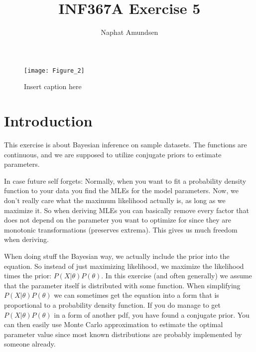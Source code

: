 \documentclass[12pt]{article}
\begin{document}
\title{\textbf{INF367A Exercise 5}}
\author{Naphat Amundsen}
\maketitle
\sectionfont{\fontsize{14}{15}\selectfont}
\subsectionfont{\fontsize{12}{15}\selectfont}
\subsubsectionfont{\fontsize{12}{15}\selectfont}
\graphicspath{ {./images/} }

\ifx
\begin{figure}[H]
	\centering
	\texttt{[image: Figure\_2]}
	\caption{Insert caption here}
\end{figure}
\fi



\section{Introduction}
This exercise is about Bayesian inference on sample datasets. The functions are continuous, and we are supposed to utilize conjugate priors to estimate parameters. 

In case future self forgets: Normally, when you want to fit a probability density function to your data you find the MLEs for the model parameters. Now, we don't really care what the maximum likelihood actually is, as long as we maximize it. So when deriving MLEs you can basically remove every factor that does not depend on the parameter you want to optimize for since they are monotonic transformations (preserves extrema). This gives us much freedom when deriving. 

When doing stuff the Bayesian way, we actually include the prior into the equation. So instead of just maximizing likelihood, we maximize the likelihood times the prior: $P(X|\theta)P(\theta)$. In this exercise (and often generally) we assume that the parameter itself is distributed with some function. When simplifying $P(X|\theta)P(\theta)$ we can sometimes get the equation into a form that is proportional to a probability density function. If you do manage to get $P(X|\theta)P(\theta)$ in a form of another pdf, you have found a conjugate prior. You can then easily use Monte Carlo approximation to estimate the optimal parameter value since most known distributions are probably implemented by someone already. 
\end{document}
